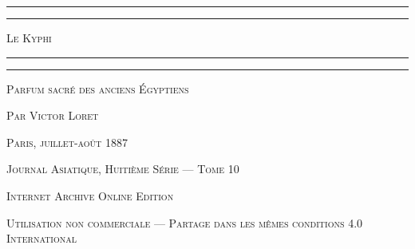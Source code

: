 \documentclass[a4paper, 11pt, oneside, landscape]{article}
\begin{document}
\begin{titlepage} %
	\centering %

	
	{\color{myRed}\rule{\textwidth}{1.6pt}\vspace*{-\baselineskip}\vspace*{2pt}} %
	{\color{myRed}\rule{\textwidth}{0.4pt}} %
	
	\vspace{1\baselineskip} %

	{\scshape\Huge Le Kyphi}
	
	\vspace{1\baselineskip} %

	{\color{myRed}\rule{\textwidth}{0.4pt}\vspace*{-\baselineskip}\vspace{3.2pt}} %
	{\color{myRed}\rule{\textwidth}{1.6pt}} %
	
	\vspace{1\baselineskip} %
	
	
	{\scshape Parfum sacré des anciens Égyptiens} %
	
	\vspace*{1\baselineskip} %
	
        {\scshape Par \Large Victor Loret} %
    
        \vspace*{\fill}

	\vspace{1\baselineskip}

	{\footnotesize\scshape Paris, juillet-août 1887}
	
	{\footnotesize\scshape{Journal Asiatique, Huitième Série --- Tome 10}}
	
	\vspace{0.5\baselineskip} %

        {\footnotesize\scshape Internet Archive Online Edition}  %
	
	{\scshape\footnotesize Utilisation non commerciale --- Partage dans les mêmes conditions 4.0 International} %
\end{titlepage}
\setlength{\parskip}{1mm plus1mm minus1mm}
\large
\clearpage
\tableofcontents
\clearpage
\end{document}
